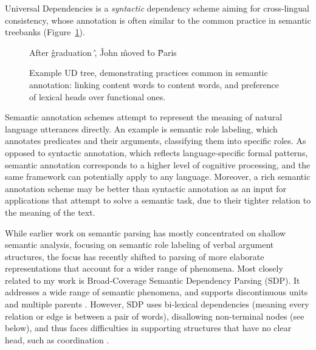 \documentclass[12pt,a4paper]{report}
\begin{document}
Universal Dependencies \citep{nivre2016universal}
is a \textit{syntactic} dependency scheme aiming for cross-lingual consistency,
whose annotation is often similar to the common practice in semantic treebanks
(Figure~\ref{fig:original_example_ud}).

\begin{figure}[t]
  \centering
    \begin{dependency}[text only label, label style={above,font=\tt}, font=\small]
    \begin{deptext}[column sep=.8em,ampersand replacement=\^]
    After \^ graduation \^ , \^ John \^ moved \^ to \^ Paris \\
    \end{deptext}
    \end{dependency}
\caption{Example UD tree, demonstrating practices common in semantic annotation:
linking content words to content words, and preference of lexical heads over functional ones.
\label{fig:original_example_ud}}
\end{figure}

Semantic annotation schemes attempt to represent the meaning of natural
language utterances directly. An example is semantic role
labeling, which annotates
predicates and their arguments, classifying them into specific roles. As
opposed to syntactic annotation, which reflects language-specific formal
patterns, semantic annotation corresponds to a higher level of cognitive
processing, and the same framework can potentially apply to any language.
Moreover, a rich semantic annotation scheme may be better than
syntactic annotation as an input for applications that attempt to solve a
semantic task, due to their tighter relation to the meaning of the text.

While earlier work on semantic parsing has mostly concentrated on shallow semantic analysis,
focusing on semantic role labeling of verbal argument structures,
the focus has recently shifted to parsing of more elaborate representations that account
for a wider range of phenomena. 
Most closely related to my work is Broad-Coverage Semantic Dependency Parsing (SDP).
It addresses a wide range of semantic phenomena,
and supports discontinuous units and multiple parents \citep{oepen2016towards}.
However, SDP uses bi-lexical dependencies
(meaning every relation or edge is between a pair of words),
disallowing non-terminal nodes (see below),
and thus faces difficulties in supporting
structures that have no clear head, such as coordination \citep{Ivanova2012who}.
\end{document}

